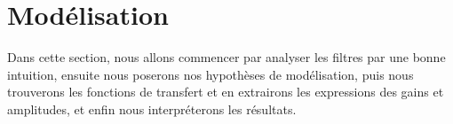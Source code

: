 \section{Modélisation}

Dans cette section, nous allons commencer par analyser les filtres
par une bonne intuition,
ensuite nous poserons nos hypothèses de modélisation,
puis nous trouverons les fonctions de transfert et en extrairons
les expressions des gains et amplitudes,
et enfin nous interpréterons les résultats.






